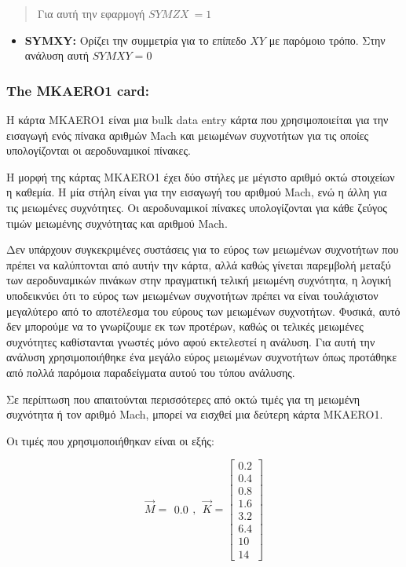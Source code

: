 \begin{quote}
Για αυτή την εφαρμογή \(SYMZX\  = 1\)
\end{quote}

\begin{itemize}
\item
\textlatin{\textbf{SYMXY:}} Ορίζει την συμμετρία για το επίπεδο $XY$ με παρόμοιο τρόπο. Στην ανάλυση αυτή \(SYMXY = 0\)
\end{itemize}

\subsubsection{\textlatin{The MKAERO1 card:}}

Η κάρτα \textlatin{MKAERO1} είναι μια \textlatin{bulk data entry} κάρτα που χρησιμοποιείται για την εισαγωγή ενός πίνακα αριθμών \textlatin{Mach} και μειωμένων συχνοτήτων για τις οποίες υπολογίζονται οι αεροδυναμικοί πίνακες.

Η μορφή της κάρτας \textlatin{MKAERO1} έχει δύο στήλες με μέγιστο αριθμό οκτώ στοιχείων η καθεμία. Η μία στήλη είναι για την εισαγωγή του αριθμού \textlatin{Mach}, ενώ η άλλη για τις μειωμένες συχνότητες. Οι αεροδυναμικοί πίνακες υπολογίζονται για κάθε ζεύγος τιμών μειωμένης συχνότητας και αριθμού \textlatin{Mach}.

Δεν υπάρχουν συγκεκριμένες συστάσεις για το εύρος των μειωμένων συχνοτήτων που πρέπει να καλύπτονται από αυτήν την κάρτα, αλλά καθώς γίνεται παρεμβολή μεταξύ των αεροδυναμικών πινάκων στην πραγματική τελική μειωμένη συχνότητα, η λογική υποδεικνύει ότι το εύρος των μειωμένων συχνοτήτων πρέπει να είναι τουλάχιστον μεγαλύτερο από το αποτέλεσμα του εύρους των μειωμένων συχνοτήτων. Φυσικά, αυτό δεν μπορούμε να το γνωρίζουμε εκ των προτέρων, καθώς οι τελικές μειωμένες συχνότητες καθίστανται γνωστές μόνο αφού εκτελεστεί η ανάλυση. Για αυτή την ανάλυση χρησιμοποιήθηκε ένα μεγάλο εύρος μειωμένων συχνοτήτων όπως προτάθηκε από πολλά παρόμοια παραδείγματα αυτού του τύπου ανάλυσης.

Σε περίπτωση που απαιτούνται περισσότερες από οκτώ τιμές για τη μειωμένη συχνότητα ή τον αριθμό \textlatin{Mach}, μπορεί να εισχθεί μια δεύτερη κάρτα \textlatin{MKAERO1}.

Οι τιμές που χρησιμοποιήθηκαν είναι οι εξής:

\[\overrightarrow{M} = \begin{matrix}
0.0
\end{matrix},\ \ \overrightarrow{K} = \begin{bmatrix}
0.2 \\
0.4 \\
0.8 \\
1.6 \\
3.2 \\
6.4 \\
10 \\
14
\end{bmatrix}\]

